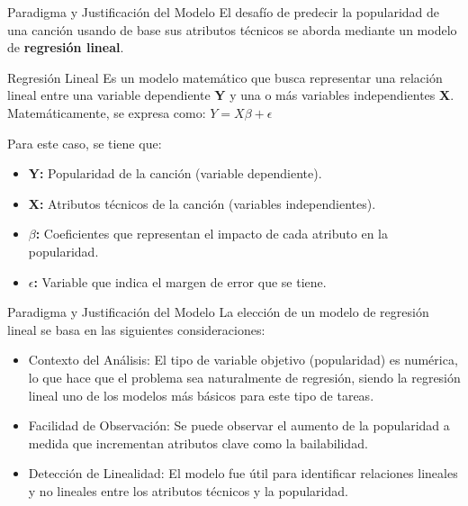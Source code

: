\documentclass[10pt, xcolor=x11names,compress]{beamer}
\begin{document}
\begin{frame}{Paradigma y Justificación del Modelo}
    \indent El desafío de predecir la popularidad de una canción usando de base sus atributos técnicos se aborda mediante un modelo de \textbf{regresión lineal}. 
    
    \begin{block}{Regresión Lineal}
        Es un modelo matemático que busca representar una relación lineal entre una variable dependiente \textbf{Y} y una o más variables 
        independientes \textbf{X}. Matemáticamente, se expresa como: $Y = X\beta + \epsilon$
    \end{block}
    \vspace{0.5em}
    Para este caso, se tiene que:
    \begin {itemize}
        \item <1-> \textbf{Y:} Popularidad de la canción (variable dependiente).
        \item <2-> \textbf{X:} Atributos técnicos de la canción (variables independientes).
        \item <3-> \textbf{$\beta$:} Coeficientes que representan el impacto de cada atributo en la popularidad.
        \item <4-> \textbf{$\epsilon$:} Variable que indica el margen de error que se tiene.
    \end{itemize}


\end{frame}

\begin{frame}{Paradigma y Justificación del Modelo}
    La elección de un modelo de regresión lineal se basa en las siguientes consideraciones: \vspace{0.8em}
    \begin{itemize}
        \item <1-> Contexto del Análisis: El tipo de variable objetivo (popularidad) es numérica, lo que hace que el problema sea naturalmente de regresión, siendo la
                   regresión lineal uno de los modelos más básicos para este tipo de tareas.
        \vspace{0.8em}
        \item <2-> Facilidad de Observación: Se puede observar el aumento de la popularidad a medida que incrementan atributos clave como la bailabilidad.
        \vspace{0.8em}
        \item <3-> Detección de Linealidad: El modelo fue útil para identificar relaciones lineales y no lineales entre los atributos técnicos y la popularidad.
        \vspace{0.8em}
        
    \end{itemize}
\end{frame}
\end{document}
